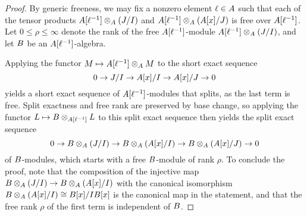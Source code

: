 \documentclass{amsart}
\begin{document}
\begin{proof}
   By generic freeness, we may fix a nonzero element $\ell \in A$ such that each of the tensor products $A[\ell^{-1}] \otimes_A (J/I)$ and $A[\ell^{-1}] \otimes_A (A[x]/J)$ is free over $A[\ell^{-1}]$.
   Let $0 \leq \rho \leq \infty$ denote the rank of the free $A[\ell^{-1}]$-module $A[\ell^{-1}] \otimes_A (J/I)$, and let $B$ be an $A[\ell^{-1}]$-algebra.

Applying the functor $M \mapsto A[\ell^{-1}] \otimes_A M$ to the short exact sequence
\[ 0 \to J/I \to A[x] / I \to A[x]/J \to 0 \] 
yields a short exact sequence of $A[\ell^{-1}]$-modules that splits, as the last term is free.
Split exactness and free rank are preserved by base change, so applying the functor $L \mapsto B \otimes_{A[\ell^{-1}]} L$ to this split exact sequence then yields the split exact sequence
\[ 0 \to B \otimes_A (J/I) \to B \otimes_A (A[x]/I) \to B \otimes_A (A[x]/J) \to 0 \] 
of $B$-modules, which starts with a free $B$-module of rank $\rho$.  
To conclude the proof, note that the composition of the injective map $B \otimes_A (J/I)  \to B \otimes_A (A[x]/I)$ with the canonical isomorphism $B \otimes_A (A[x]/I) \cong B[x]/I B[x]$ is the canonical map in the statement, and that the free rank $\rho$ of the first term is independent of $B$.
\end{proof}
\end{document}
